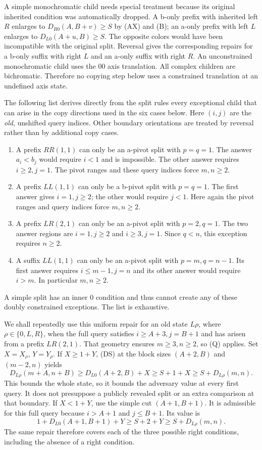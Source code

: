 \documentclass[11pt]{article}
\theoremstyle{definition}
\theoremstyle{remark}
\begin{document}
A simple monochromatic child needs special treatment because its original
inherited condition was automatically dropped. A b-only prefix with inherited
left $R$ enlarges to $D_{R0}(A,B+v)\ge S$ by (AX) and (B); an a-only prefix
with left $L$ enlarges to $D_{L0}(A+u,B)\ge S$. The opposite colors would have
been incompatible with the original split. Reversal gives the corresponding
repairs for a b-only suffix with right $L$ and an a-only suffix with right $R$.
An unconstrained monochromatic child uses the $00$ axis translation.
All complex children are bichromatic. Therefore no copying step below uses
a constrained translation at an undefined axis state.

The following list derives directly from the split rules every exceptional
child that can arise in the copy directions used in the six cases below.
Here $(i,j)$ are the \emph{old}, unshifted query indices. Other boundary
orientations are treated by reversal rather than by additional copy cases.
\begin{enumerate}
\item A prefix $RR(1,1)$ can only be an a-pivot split with $p=q=1$.
The answer $a_i<b_j$ would require $i<1$ and is impossible. The other
answer requires $i\ge2,j=1$. The pivot ranges and these query indices
force $m,n\ge2$.
\item A prefix $LL(1,1)$ can only be a b-pivot split with $p=q=1$.
The first answer gives $i=1,j\ge2$; the other would require $j<1$.
Here again the pivot ranges and query indices force $m,n\ge2$.
\item A prefix $LR(2,1)$ can only be an a-pivot split with $p=2,q=1$.
The two answer regions are $i=1,j\ge2$ and $i\ge3,j=1$.
Since $q<n$, this exception requires $n\ge2$.
\item A suffix $LL(1,1)$ can only be an a-pivot split with $p=m,q=n-1$.
Its first answer requires $i\le m-1,j=n$ and its other answer would
require $i>m$. In particular $m,n\ge2$.
\end{enumerate}
A simple split has an inner $0$ condition and thus cannot create any of
these doubly constrained exceptions. The list is exhaustive.

We shall repeatedly use this uniform repair for an old state $L\rho$,
where $\rho\in\{0,L,R\}$, when the full query satisfies
$i\ge A+3,j=B+1$ and has arisen from a prefix $LR(2,1)$.
That geometry ensures $m\ge3,n\ge2$, so (Q) applies. Set
$X=X_\rho$, $Y=Y_\rho$. If $X\ge1+Y$, (DS) at the block sizes
$(A+2,B)$ and $(m-2,n)$ yields
\begin{equation}
 D_{L\rho}(m+A,n+B)
 \ge D_{L0}(A+2,B)+X\ge S+1+X\ge S+D_{L\rho}(m,n).
 \tag{Repair-1}
\end{equation}
This bounds the whole state, so it bounds the adversary value at every
first query. It does not presuppose a publicly revealed split or an extra
comparison at that boundary. If $X<1+Y$, use the simple cut $(A+1,B+1)$.
It is admissible for this full query because $i>A+1$ and $j\le B+1$.
Its value is
\begin{equation}
 1+D_{L0}(A+1,B+1)+Y\ge S+2+Y\ge S+D_{L\rho}(m,n).
 \tag{Repair-2}
\end{equation}
The same repair therefore covers each of the three possible right
conditions, including the absence of a right condition.
\end{document}
